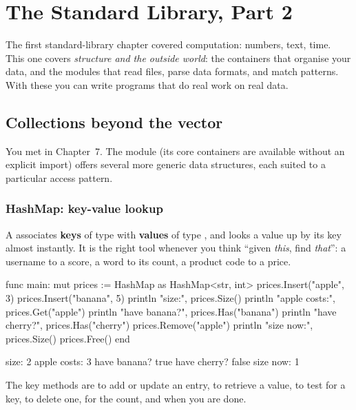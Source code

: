 \chapter{The Standard Library, Part 2}%
\label{ch:stdlib-2}

The first standard-library chapter covered computation: numbers, text, time. This
one covers \emph{structure and the outside world}: the containers that organise
your data, and the modules that read files, parse data formats, and match
patterns. With these you can write programs that do real work on real data.

\section{Collections beyond the vector}

You met  in Chapter~7. The  module (its core
containers are available without an explicit import) offers several more
generic data structures, each suited to a particular access pattern.

\subsection{HashMap: key-value lookup}

A  associates \textbf{keys} of type  with
\textbf{values} of type , and looks a value up by its key almost
instantly. It is the right tool whenever you think ``given \emph{this}, find
\emph{that}'': a username to a score, a word to its count, a product code to a
price.

\begin{salamen}
func main:
    mut prices := HashMap {} as HashMap<str, int>
    prices.Insert("apple", 3)
    prices.Insert("banana", 5)
    println "size:", prices.Size()
    println "apple costs:", prices.Get("apple")
    println "have banana?", prices.Has("banana")
    println "have cherry?", prices.Has("cherry")
    prices.Remove("apple")
    println "size now:", prices.Size()
    prices.Free()
end
\end{salamen}

\begin{progout}
size: 2
apple costs: 3
have banana? true
have cherry? false
size now: 1
\end{progout}

The key methods are  to add or update an entry, 
to retrieve a value,  to test for a key,  to delete
one,  for the count, and  when you are done.

